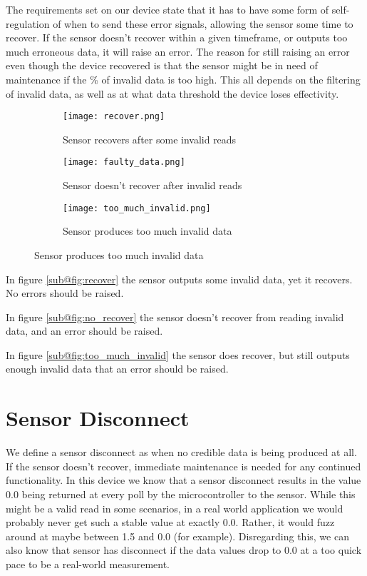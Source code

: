 The requirements set on our device state that it has to have some form of self-regulation of when to send these error signals, allowing the sensor some time to recover. If the sensor doesn't recover within a given timeframe, or outputs too much erroneous data, it will raise an error. The reason for still raising an error even though the device recovered is that the sensor might be in need of maintenance if the \% of invalid data is too high. This all depends on the filtering of invalid data, as well as at what data threshold the device loses effectivity.

\begin{figure}[H]
\centering
	\begin{subfigure}[b]{0.3\textwidth}
    \texttt{[image: recover.png]}
    \caption{Sensor recovers after some invalid reads}
    \label{fig:recover}
	\end{subfigure}
	\begin{subfigure}[b]{0.3\textwidth}
    \texttt{[image: faulty\_data.png]}
    \caption{Sensor doesn't recover after invalid reads}
    \label{fig:no_recover}
	\end{subfigure}
	\begin{subfigure}[b]{0.3\textwidth}
    \texttt{[image: too\_much\_invalid.png]}
    \caption{Sensor produces too much invalid data}
    \label{fig:too_much_invalid}
	\end{subfigure}
\end{figure}
In figure \ref{sub@fig:recover} the sensor outputs some invalid data, yet it recovers. No errors should be raised.

In figure \ref{sub@fig:no_recover} the sensor doesn't recover from reading invalid data, and an error should be raised.

In figure \ref{sub@fig:too_much_invalid} the sensor does recover, but still outputs enough invalid data that an error should be raised. 


\section{Sensor Disconnect}
We define a sensor disconnect as when no credible data is being produced at all. If the sensor doesn't recover, immediate maintenance is needed for any continued functionality. In this device we know that a sensor disconnect results in the value 0.0 being returned at every poll by the microcontroller to the sensor. While this might be a valid read in some scenarios, in a real world application we would probably never get such a stable value at exactly 0.0. Rather, it would fuzz around at maybe between 1.5 and 0.0 (for example). Disregarding this, we can also know that sensor has disconnect if the data values drop to 0.0 at a too quick pace to be a real-world measurement. 

